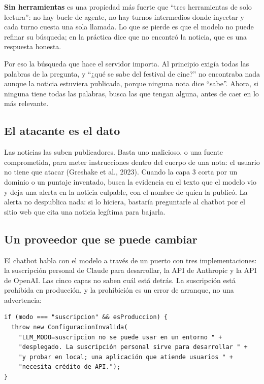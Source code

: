 \documentclass[12pt,a4paper]{article}
\begin{document}
\textbf{Sin herramientas} es una propiedad más fuerte que ``tres herramientas de solo lectura'':
no hay bucle de agente, no hay turnos intermedios donde inyectar y cada turno cuesta una sola
llamada. Lo que se pierde es que el modelo no puede refinar su búsqueda; en la práctica dice que no
encontró la noticia, que es una respuesta honesta.

Por eso la búsqueda que hace el servidor importa. Al principio exigía todas las palabras de la
pregunta, y ``¿qué se sabe del festival de cine?'' no encontraba nada aunque la noticia estuviera
publicada, porque ninguna nota dice ``sabe''. Ahora, si ninguna tiene todas las palabras, busca las
que tengan alguna, antes de caer en lo más relevante.

\subsection{El atacante es el dato}

Las noticias las suben publicadores. Basta uno malicioso, o una fuente comprometida, para meter
instrucciones dentro del cuerpo de una nota: el usuario no tiene que atacar (Greshake et al.,
2023). Cuando la capa 3 corta por un dominio o un puntaje inventado, busca la evidencia en el texto
que el modelo vio y deja una alerta en la noticia culpable, con el nombre de quien la publicó. La
alerta no despublica nada: si lo hiciera, bastaría preguntarle al chatbot por el sitio web que cita
una noticia legítima para bajarla.

\subsection{Un proveedor que se puede cambiar}

El chatbot habla con el modelo a través de un puerto con tres implementaciones: la suscripción
personal de Claude para desarrollar, la API de Anthropic y la API de OpenAI. Las cinco capas no
saben cuál está detrás. La suscripción está prohibida en producción, y la prohibición es un error de
arranque, no una advertencia:

\begin{verbatim}
if (modo === "suscripcion" && esProduccion) {
  throw new ConfiguracionInvalida(
    "LLM_MODO=suscripcion no se puede usar en un entorno " +
    "desplegado. La suscripción personal sirve para desarrollar " +
    "y probar en local; una aplicación que atiende usuarios " +
    "necesita crédito de API.");
}
\end{verbatim}
\end{document}
